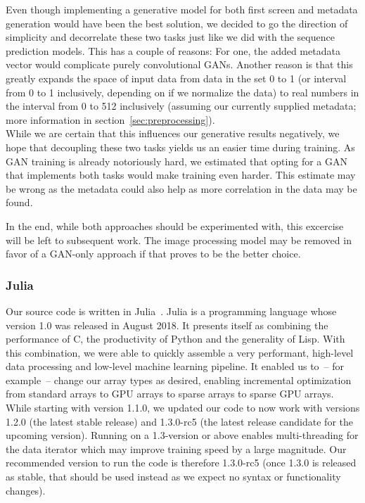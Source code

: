 Even though implementing a generative model for both first screen and
metadata generation would have been the best solution, we decided to
go the direction of simplicity and decorrelate these two tasks just
like we did with the sequence prediction models. This has a couple of
reasons: For one, the added metadata vector would complicate purely
convolutional GANs. Another reason is that this greatly expands the
space of input data from data in the set 0 to 1 (or interval from 0 to
1 inclusively, depending on if we normalize the data) to real numbers
in the interval from 0 to 512 inclusively (assuming our currently
supplied metadata; more information in
section~\ref{sec:preprocessing}). \\
While we are certain that this influences our generative results
negatively, we hope that decoupling these two tasks yields us an
easier time during training. As GAN training is already notoriously
hard, we estimated that opting for a GAN that implements both tasks
would make training even harder. This estimate may be wrong as the
metadata could also help as more correlation in the data may be found.

In the end, while both approaches should be experimented with, this
excercise will be left to subsequent work. The image processing model
may be removed in favor of a GAN-only approach if that proves to be
the better choice.

\subsubsection{Julia}
\label{sec:julia}

Our source code is written in
Julia~\cite{bezansonJuliaFreshApproach2017}. Julia is a programming
language whose version 1.0 was released in August 2018. It presents
itself as combining the performance of C, the productivity of Python
and the generality of Lisp. With this combination, we were able to
quickly assemble a very performant, high-level data processing and
low-level machine learning pipeline. It enabled us to~-- for example~--
change our array types as desired, enabling incremental optimization
from standard arrays to GPU arrays to sparse arrays to sparse GPU
arrays. While starting with version 1.1.0, we updated our code to now
work with versions 1.2.0 (the latest stable release) and 1.3.0-rc5
(the latest release candidate for the upcoming version). Running on a
1.3-version or above enables multi-threading for the data iterator
which may improve training speed by a large magnitude. Our recommended
version to run the code is therefore 1.3.0-rc5 (once 1.3.0 is released
as stable, that should be used instead as we expect no syntax or
functionality changes).

